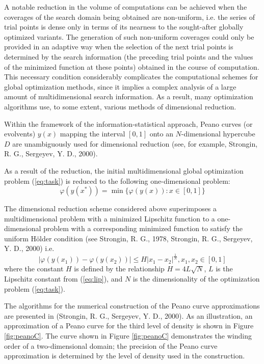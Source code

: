 \documentclass{gOMS2e}
\theoremstyle{plain}%
\theoremstyle{definition}
\theoremstyle{remark}
\begin{document}
A notable reduction in the volume of computations can be achieved when the coverages of the
search domain being obtained are non-uniform, i.e. the series of trial points is dense
only in terms of its nearness to the sought-after globally optimized variants.
The generation of such non-uniform coverages could only be provided in an adaptive
way when the selection of the next trial points is determined by the search information
(the preceding trial points and the values of the minimized function at these points)
obtained in the course of computation. This necessary condition considerably
complicates the computational schemes for global optimization methods, since it
implies a complex analysis of a large amount of multidimensional search information.
As a result, many optimization algorithms use, to some extent, various methods of dimensional reduction.
\par
Within the framework of the information-statistical approach, Peano curves (or evolvents)
\(y(x)\) mapping the interval \([0, 1]\) onto an \(N\)-dimensional hypercube \(D\) are
unambiguously used for dimensional reduction (see, for example, Strongin, R. G., Sergeyev, Y. D., 2000).
\par
As a result of the reduction, the initial multidimensional global optimization
problem (\ref{eq:task}) is reduced to the following one-dimensional problem:
\begin{equation}
\label{eq:oneDimTask}
\varphi(y(x^*))=\min\{\varphi(y(x)):x\in [0,1]\}
\end{equation}
\par
The dimensional reduction scheme considered above superimposes a multidimensional
problem with a minimized Lipschitz function to a one-dimensional problem with a
corresponding minimized function to satisfy the uniform Hölder condition (see Strongin, R. G., 1978, Strongin, R. G., Sergeyev, Y. D., 2000) i.e.
\begin{equation}
\label{eq:holder}
|\varphi(y(x_1))-\varphi(y(x_2))|\leqslant H{|x_1-x_2|}^{\frac{1}{N}},x_1,x_2\in[0,1]
\end{equation}
where the constant \(H\) is defined by the relationship \(H=4L\sqrt{N}\), \(L\) is the
Lipschitz constant from (\ref{eq:lip}), and \(N\) is the dimensionality of the optimization problem (\ref{eq:task}).
\par
The algorithms for the numerical construction of the Peano curve approximations are presented in (Strongin, R. G., Sergeyev, Y. D., 2000).
As an illustration, an approximation of a Peano curve for the third level of density is
shown in Figure \ref{fig:peanoC}. The curve shown in Figure \ref{fig:peanoC} demonstrates the winding order of a
two-dimensional domain; the precision of the Peano curve approximation is determined by the
level of density used in the construction.
\end{document}
